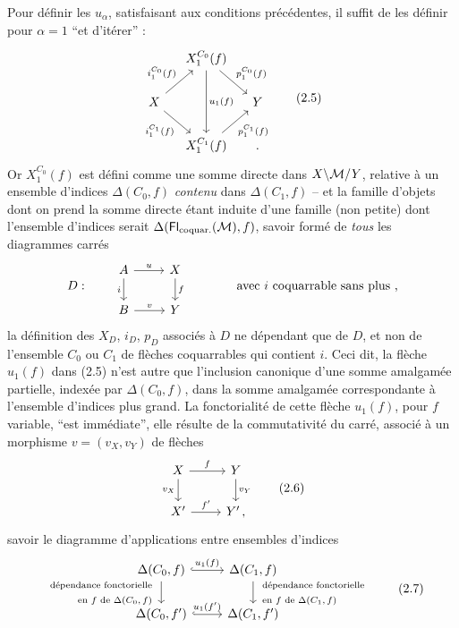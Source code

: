 Pour définir les $u_\alpha$, satisfaisant aux conditions précédentes, il suffit de les définir pour $\alpha=1$ ``et d'itérer'' :
\[
\begin{tikzcd}[column sep=small]
& X_1^{C_0}(f) \arrow[dd, "u_1(f)"] \arrow[dr, "p_1^{C_0}(f)"] & \\
X \arrow[ur, "i_1^{C_0}(f)"] \arrow[dr, "i_1^{C_1}(f)"'] & & Y \\
& X_1^{C_1}(f) \arrow[ur, "p_1^{C_1}(f)"'] & {}.
\end{tikzcd}
\tag*{(2.5)}
\]
Or $X_1^{C_0}(f)$ est défini comme une somme directe dans $X\backslash\mathcal{M}/Y$, relative à un ensemble d'indices $\Delta(C_0,f)$ \textit{contenu} dans $\Delta(C_1,f)$ -- et la famille d'objets dont on prend la somme directe étant induite d'une famille (non petite) dont l'ensemble d'indices serait $\Delta(\mathsf{Fl}_{\text{coquar.}}(\mathcal{M}),f)$, savoir formé de \textit{tous} les diagrammes carrés
\[
D : \qquad
\begin{tikzcd}
A \arrow[r, "u"] \arrow[d, "i"'] & X \arrow[d, "f"] \\
B \arrow[r, "v"] & Y
\end{tikzcd}
\qquad\qquad \text{avec $i$ coquarrable sans plus ,}
\]
la définition des $X_D$, $i_D$, $p_D$ associés à $D$ ne dépendant que de $D$, et non de l'ensemble $C_0$ ou $C_1$ de flèches coquarrables qui contient $i$. Ceci dit, la flèche $u_1(f)$
dans (2.5) n'est autre que l'inclusion canonique d'une somme amalgamée partielle, indexée par $\Delta(C_0,f)$, dans la somme amalgamée correspondante à l'ensemble d'indices plus grand. La fonctorialité de cette flèche $u_1(f)$, pour $f$ variable, ``est immédiate'', elle résulte de la commutativité du carré, associé à un morphisme $v=(v_X,v_Y)$ de flèches
\[
\begin{tikzcd}
X \arrow[r, "f"] \arrow[d, "v_X"'] & Y \arrow[d, "v_Y"] \\
X' \arrow[r, "f'"] & Y'\,,
\end{tikzcd}
\tag*{(2.6)}
\]
savoir le diagramme d'applications entre ensembles d'indices
\[
\begin{tikzcd}
\Delta(C_0,f) \arrow[r, hook, "u_1(f)"] \arrow[d, "{\begin{array}{r}\text{dépendance fonctorielle}\\ \text{en $f$ de $\Delta(C_0,f)$}\end{array}}"'] & \Delta(C_1,f) \arrow[d, "{\begin{array}{l}\text{dépendance fonctorielle}\\ \text{en $f$ de $\Delta(C_1,f)$}\end{array}}"] \\
\Delta(C_0,f') \arrow[r, hook, "u_1(f')"] & \Delta(C_1,f')
\end{tikzcd}
\tag*{(2.7)}
\]
